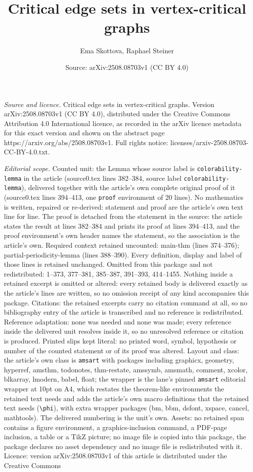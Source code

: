 \documentclass[10pt,a4paper]{amsart}
\title[Critical edge sets in vertex-critical graphs]{Critical edge sets in vertex-critical graphs}
\author{Ema Skottova, Raphael Steiner}
\date{Source: arXiv:2508.08703v1 (CC BY 4.0)}
\begin{document}
\maketitle

\noindent\emph{Source and licence.} Critical edge sets in vertex-critical graphs. Version arXiv:2508.08703v1 (CC BY 4.0), distributed under the Creative Commons Attribution 4.0 International licence, as recorded in the arXiv licence metadata for this exact version and shown on the abstract page https://arxiv.org/abs/2508.08703v1. Full rights notice: licenses/arxiv-2508.08703-CC-BY-4.0.txt.\par\smallskip

\noindent\textit{Editorial scope.} Counted unit: the Lemma whose source label is \texttt{colorability-lemma} in the article (source0.tex lines 382--384, source label \texttt{colorability-lemma}), delivered together with the article's own complete original proof of it (source0.tex lines 394--413, one \texttt{proof} environment of 20 lines). No mathematics is written, repaired or re-derived: statement and proof are the article's own text line for line. The proof is detached from the statement in the source: the article states the result at lines 382--384 and prints its proof at lines 394--413, and the proof environment's own header names the statement, so the association is the article's own. Required context retained uncounted: main-thm (lines 374--376); partial-periodicity-lemma (lines 388--390). Every definition, display and label of those lines is retained unchanged. Omitted from this package and not redistributed: 1--373, 377--381, 385--387, 391--393, 414--1455. Nothing inside a retained excerpt is omitted or altered: every retained body is delivered exactly as the article's lines are written, so no omission receipt of any kind accompanies this package. Citations: the retained excerpts carry no citation command at all, so no bibliography entry of the article is transcribed and no reference is redistributed. Reference adaptation: none was needed and none was made; every reference inside the delivered unit resolves inside it, so no unresolved reference or citation is produced. Printed slips kept literal: no printed word, symbol, hypothesis or number of the counted statement or of its proof was altered. Layout and class: the article's own class is \texttt{amsart} with packages including graphicx, geometry, hyperref, amsthm, todonotes, thm-restate, amssymb, amsmath, comment, xcolor, blkarray, lmodern, babel, float; the wrapper is the lane's pinned \texttt{amsart} editorial wrapper at 10pt on A4, which restates the theorem-like environments the retained text needs and adds the article's own macro definitions that the retained text needs (\texttt{\textbackslash phi}), with extra wrapper packages (bm, bbm, dsfont, xspace, cancel, mathtools). The delivered numbering is the unit's own. Assets: no retained span contains a figure environment, a graphics-inclusion command, a PDF-page inclusion, a table or a TikZ picture; no image file is copied into this package, the package declares no asset dependency and no image file is redistributed with it. Licence: version arXiv:2508.08703v1 of this article is distributed under the Creative Commons 
\end{document}
